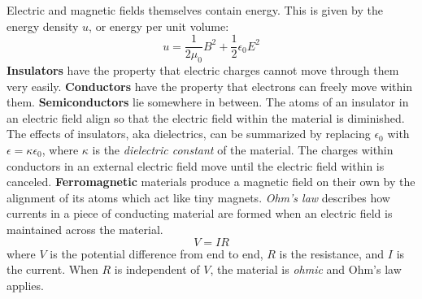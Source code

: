     Electric and magnetic fields themselves contain energy. This is given by the energy density $u$, or energy per unit volume:
    \begin{equation*}
        u = \frac{1}{2\mu_0}B^2 + \frac{1}{2}\epsilon_0E^2
    \end{equation*}
    \textbf{Insulators} have the property that electric charges cannot move through them very easily. \textbf{Conductors} have the property that electrons can freely move within them. \textbf{Semiconductors} lie somewhere in between. 
    \newline \indent
    The  atoms of an insulator in an electric field align so that the electric field within the material is diminished. The effects of insulators, aka dielectrics, can be summarized by replacing $\epsilon_0$ with $\epsilon = \kappa\epsilon_0$, where $\kappa$ is the \textit{dielectric constant} of the material. The charges within conductors in an external electric field move until the electric field within is canceled. \textbf{Ferromagnetic} materials produce a magnetic field on their own by the alignment of its atoms which act like tiny magnets.
    \newline \indent
    \textit{Ohm's law} describes how currents in a piece of conducting material are formed when an electric field is maintained across the material.
    \begin{equation*}
        V = IR
    \end{equation*}
    where $V$ is the potential difference from end to end, $R$ is the resistance, and $I$ is the current. When $R$ is independent of $V$, the material is \textit{ohmic} and Ohm's law applies.